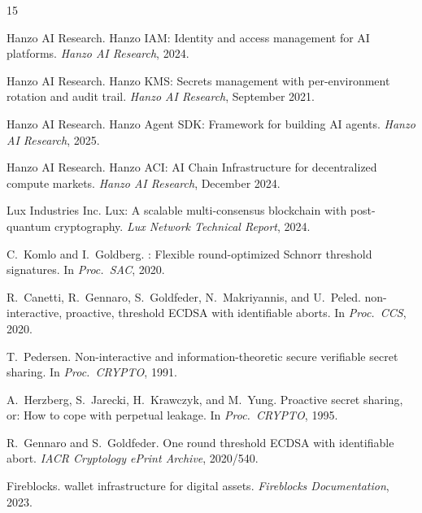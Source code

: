 \begin{thebibliography}{15}

{Hanzo AI Research}.
\newblock Hanzo {IAM}: Identity and access management for {AI} platforms.
\newblock \emph{Hanzo AI Research}, 2024.

{Hanzo AI Research}.
\newblock Hanzo {KMS}: Secrets management with per-environment rotation and audit trail.
\newblock \emph{Hanzo AI Research}, September 2021.

{Hanzo AI Research}.
\newblock Hanzo Agent {SDK}: Framework for building {AI} agents.
\newblock \emph{Hanzo AI Research}, 2025.

{Hanzo AI Research}.
\newblock Hanzo {ACI}: {AI} Chain Infrastructure for decentralized compute markets.
\newblock \emph{Hanzo AI Research}, December 2024.

{Lux Industries Inc}.
\newblock Lux: A scalable multi-consensus blockchain with post-quantum cryptography.
\newblock \emph{Lux Network Technical Report}, 2024.

C.~Komlo and I.~Goldberg.
: Flexible round-optimized {Schnorr} threshold signatures.
\newblock In \emph{Proc.\ SAC}, 2020.

R.~Canetti, R.~Gennaro, S.~Goldfeder, N.~Makriyannis, and U.~Peled.
 non-interactive, proactive, threshold {ECDSA} with identifiable aborts.
\newblock In \emph{Proc.\ CCS}, 2020.

T.~Pedersen.
\newblock Non-interactive and information-theoretic secure verifiable secret sharing.
\newblock In \emph{Proc.\ CRYPTO}, 1991.

A.~Herzberg, S.~Jarecki, H.~Krawczyk, and M.~Yung.
\newblock Proactive secret sharing, or: How to cope with perpetual leakage.
\newblock In \emph{Proc.\ CRYPTO}, 1995.

R.~Gennaro and S.~Goldfeder.
\newblock One round threshold {ECDSA} with identifiable abort.
\newblock \emph{IACR Cryptology ePrint Archive}, 2020/540.

{Fireblocks}.
 wallet infrastructure for digital assets.
\newblock \emph{Fireblocks Documentation}, 2023.

\end{thebibliography}


